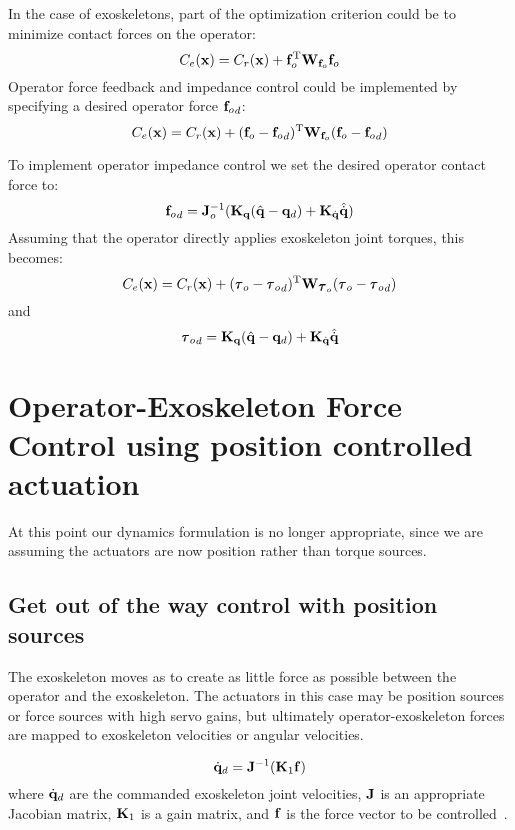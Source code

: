 \documentclass[letterpaper,12pt,fullpage]{article}
\begin{document}
In the case of exoskeletons, part of the optimization criterion could be to
minimize contact forces on the operator:
\begin{equation}
C_e({\bf x}) = C_r({\bf x}) + {\bf f}^{{\rm T}}_o {\bf W}_{{\bf f}_o} {\bf f}_o
\end{equation}
Operator force feedback and impedance control could be implemented by specifying a
desired operator force ${{\bf f}_o}_d$:
\begin{equation}
C_e({\bf x}) = C_r({\bf x}) + ({\bf f}_o - {{\bf f}_o}_d)^{{\rm T}} {\bf W}_{{\bf f}_o} ({\bf f}_o - {{\bf f}_o}_d)
\end{equation}

To implement operator impedance control we set the desired operator contact force to:
\begin{equation}
{{\bf f}_o}_d = {\bf J}_o^{-1} ( {\bf K}_{{\bf q}}( \hat{{\bf q}} - {\bf q}_d ) + {\bf K}_{\dot{{\bf q}}} \hat{\dot{{\bf q}}} )
\end{equation}
Assuming that the operator directly applies exoskeleton joint torques, this becomes:
\begin{equation}
C_e(\vx) = C_r(\vx) 
+ (\vtau_o - {\vtau_o}_d)^{\tr} \mW_{\vtau_o} (\vtau_o - {\vtau_o}_d)
\end{equation}
and
\begin{equation}
{\vtau_o}_d = \mK_{\vq}( \hat{\vq} - \vq_d ) + \mK_{\dot{\vq}} \hat{\dot{\vq}}
\end{equation}

\section{Operator-Exoskeleton Force Control using position controlled actuation}

At this point our dynamics formulation is no longer appropriate, since we
are assuming the actuators are now position rather than torque sources.

\subsection{Get out of the way control with position sources}

The exoskeleton moves as to create as little force as possible between the
operator and the exoskeleton. The actuators in this case may be position sources or
force sources with high servo gains,
but ultimately operator-exoskeleton forces are mapped
to exoskeleton velocities or angular velocities.

\begin{equation}
\dot{{\bf q}}_d = {\bf J}^{-1} ({\bf K}_1 {\bf f})
\label{eq:gootwcps}
\end{equation}
where $\dot{{\bf q}}_d$ are the commanded exoskeleton joint velocities,
${\bf J}$ is an appropriate Jacobian matrix, ${\bf K}_1$ is a gain matrix,
and ${\bf f}$ is the force vector to be controlled~\cite{IEEE06990981}.
\end{document}
